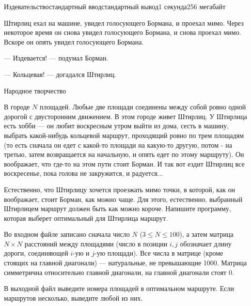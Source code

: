\begin{problem}{Издевательство}{стандартный ввод}{стандартный вывод}{1 секунда}{256 мегабайт}

\epigraph{
Штирлиц ехал на машине, увидел голосующего Бормана, и проехал мимо. Через некоторое время он снова увидел голосующего Бормана, и снова проехал мимо. Вскоре он опять увидел голосующего Бормана. 

--- Издевается! --- подумал Борман.

--- Кольцевая! --- догадался Штирлиц.}{Народное творчество}



В городе $N$ площадей. Любые две площади соединены между собой ровно одной дорогой с двусторонним движением. В этом городе живет Штирлиц. У Штирлица есть хобби --- он любит воскресным утром выйти из дома, сесть в машину, выбрать какой-нибудь кольцевой маршрут, проходящий ровно по трем площадям (то есть сначала он едет с какой-то площади на какую-то другую, потом - на третью, затем возвращается на начальную, и опять едет по этому маршруту). Он воображает, что где-то на этом пути стоит Борман. И так вот ездит Штирлиц все воскресенье, пока голова не закружится, и радуется...

Естественно, что Штирлицу хочется проезжать мимо точки, в которой, как он воображает, стоит Борман, как можно чаще. Для этого, естественно, выбранный Штирлицем маршрут должен быть как можно короче. Напишите программу, которая выберет оптимальный для Штирлица маршрут.

\InputFile
Во входном файле записано сначала число $N$ ($3 \le N \le 100$), а затем матрица $N \times N$ расстояний между площадями (число в позиции $i, j$ обозначает длину дороги, соединяющей $i$-ую и $j$-ую площади). Все числа в матрице (кроме стоящих на главной диагонали) --- натуральные, не превышающие 1000. Матрица симметрична относительно главной диагонали, на главной диагонали стоят 0. 

\OutputFile
В выходной файл выведите номера площадей в оптимальном маршруте. Если маршрутов несколько, выведите любой из них. 

\Example

\begin{example}
%
\end{example}

\end{problem}

